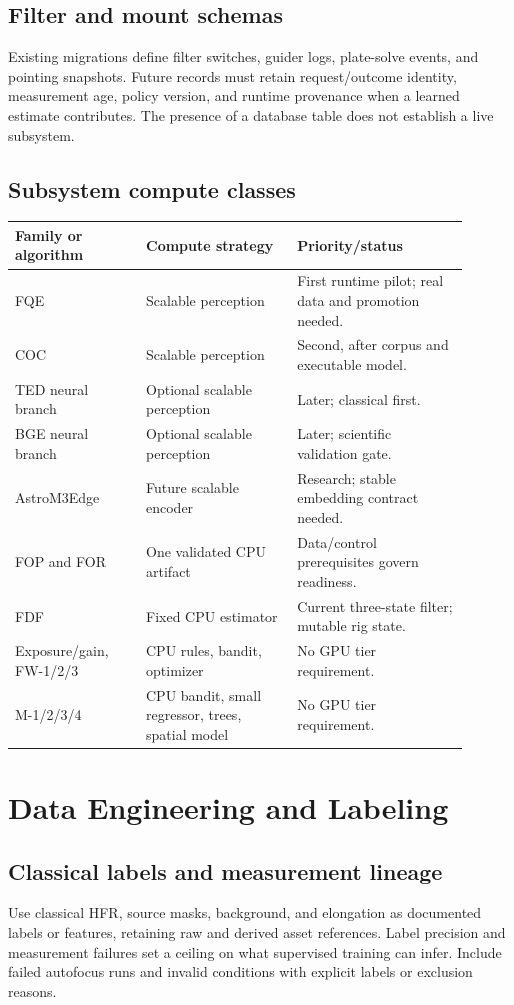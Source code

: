 \documentclass[11pt,a4paper]{article}
\begin{document}
\subsection{Filter and mount schemas}
Existing migrations define filter switches, guider logs, plate-solve events,
and pointing snapshots. Future records must retain request/outcome identity,
measurement age, policy version, and runtime provenance when a learned estimate
contributes. The presence of a database table does not establish a live subsystem.

\subsection{Subsystem compute classes}
\begin{longtable}{@{}L{0.26\linewidth}L{0.30\linewidth}L{0.34\linewidth}@{}}
\toprule Family or algorithm & Compute strategy & Priority/status\\\midrule\endhead
FQE & Scalable perception & First runtime pilot; real data and promotion needed.\\
COC & Scalable perception & Second, after corpus and executable model.\\
TED neural branch & Optional scalable perception & Later; classical first.\\
BGE neural branch & Optional scalable perception & Later; scientific validation gate.\\
AstroM3Edge & Future scalable encoder & Research; stable embedding contract needed.\\
FOP and FOR & One validated CPU artifact & Data/control prerequisites govern readiness.\\
FDF & Fixed CPU estimator & Current three-state filter; mutable rig state.\\
Exposure/gain, FW-1/2/3 & CPU rules, bandit, optimizer & No GPU tier requirement.\\
M-1/2/3/4 & CPU bandit, small regressor, trees, spatial model & No GPU tier requirement.\\
\bottomrule
\end{longtable}

\section{Data Engineering and Labeling}
\subsection{Classical labels and measurement lineage}
Use classical HFR, source masks, background, and elongation as documented
labels or features, retaining raw and derived asset references. Label precision
and measurement failures set a ceiling on what supervised training can infer.
Include failed autofocus runs and invalid conditions with explicit labels or
exclusion reasons.
\end{document}
